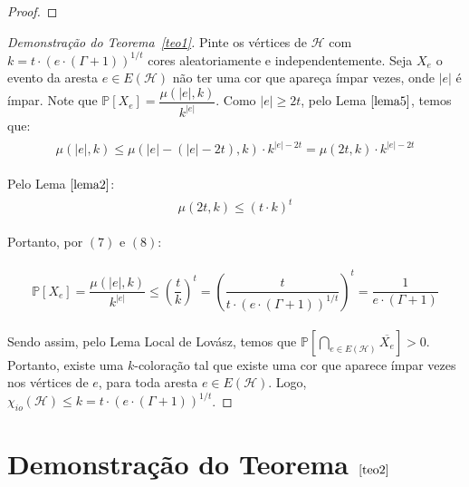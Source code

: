 \documentclass[12pt]{article}
\begin{document}
{\begin{proof}
	
\end{proof} \newl

 
\begin{proof}[Demonstração do Teorema~\ref{teo1}]
	Pinte os vértices de $\mathcal{H}$ com $k = t {\cdot} (e {\cdot} (\Gamma + 1))^{1/t}$ cores aleatoriamente e independentemente. Seja $X_{e}$ o evento da aresta $e \in E(\mathcal{H})$ não ter uma cor que apareça ímpar vezes, onde $|e|$ é ímpar. Note que $\mathds{P}[X_{e}] = \dfrac{\mu(|e|, k)}{k^{|e|}}$. Como $|e| \geq 2t$, pelo Lema $\ref{lema5}$, temos que: 
	\begin{align}
		\begin{split}
			\mu(|e|, k) \leq \mu(|e| - (|e| - 2t), k) {\cdot} k^{|e| - 2t} = \mu(2t, k) {\cdot} k^{|e| - 2t}
		\end{split} 
	\end{align} 

	Pelo Lema $\ref{lema2}$:
 	\begin{align}
 		\begin{split}
 			\mu(2t, k) \leq (t {\cdot } k)^t
 		\end{split} 
 	\end{align} 
  
    Portanto, por $(7)$ e $(8)$:
    
	\begin{align}
		\begin{split}
			\mathds{P}[X_{e}] = \dfrac{\mu(|e|, k)}{k^{|e|}} 
			 \leq \left(\dfrac{t}{k}\right)^t  = \left(\dfrac{t}{t {\cdot}   (e {\cdot} (\Gamma + 1))^{1/t}}\right)^t = \dfrac{1}{e {\cdot} (\Gamma + 1)}
		\end{split} 
	\end{align}
	
  Sendo assim, pelo Lema Local de Lovász, temos que $\mathds{P}[\bigcap\limits_{e \in E(\mathcal{H})} \overline{X_{e}} ] > 0$. Portanto, existe uma $k$-coloração tal que existe uma cor que aparece ímpar vezes nos vértices de $e$, para toda aresta $e \in E(\mathcal{H})$. Logo, $\chi_{io}(\mathcal{H}) \leq k = t {\cdot} (e {\cdot} (\Gamma + 1))^{1/t}$.
	
\end{proof}\newbegin
 
  \section{Demonstração do Teorema $\ref{teo2}$} \newl
  
}
\end{document}

